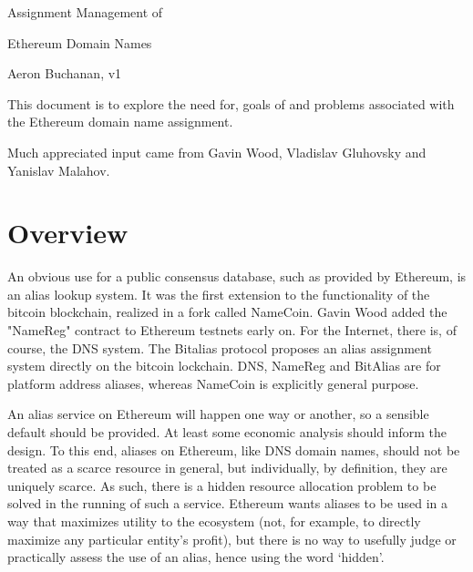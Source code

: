 \documentclass[10pt,a4paper]{article}
\begin{document}
\def\ether{Ether\xspace}
\def\ie{{i.e.}\xspace}
\def\eg{{e.g.}\xspace}
\def\tld{{\sc tld}}
\def\tlds{\tld{s}\xspace}
\def\sld{{\sc sld}}
\def\slds{\sld{s}\xspace}
\def\icann{{\sc icann}\xspace}
\def\qrcode{{\sc qr}-code\xspace}
\def\qrcodes{\qrcode{s}\xspace}
\def\nfc{{\sc nfc}\xspace}
\def\dapp{{\sc da}pp\xspace}
\def\dapps{\dapp{s}\xspace}
\def\dao{{\sc dao}\xspace}
\def\daos{\dao{s}\xspace}
\def\ambedon{{\sc ambedon}\xspace}

\begin{center}
{\huge Assignment Management of 

Ethereum Domain Names}

\vspace{0.6cm}
{\small Aeron Buchanan, v1}
\end{center}

This document is to explore the need for, goals of and problems associated with the Ethereum domain name assignment.

Much appreciated input came from Gavin Wood, Vladislav Gluhovsky and Yanislav Malahov.

\section*{Overview}

An obvious use for a public consensus database, such as provided by Ethereum, is an alias lookup system. It was the first extension to the functionality of the bitcoin blockchain, realized in a fork called NameCoin. Gavin Wood added the "NameReg" contract to Ethereum testnets early on. For the Internet, there is, of course, the DNS system. The Bitalias protocol proposes an alias assignment system directly on the bitcoin lockchain. DNS, NameReg and BitAlias are for platform address aliases, whereas NameCoin is explicitly general purpose. 

An alias service on Ethereum will happen one way or another, so a sensible default should be provided. At least some economic analysis should inform the design. To this end, aliases on Ethereum, like DNS domain names, should not be treated as a scarce resource in general, but individually, by definition, they are uniquely scarce. As such, there is a hidden resource allocation problem to be solved in the running of such a service. Ethereum wants aliases to be used in a way that maximizes utility to the ecosystem (not, for example, to directly maximize any particular entity's profit), but there is no way to usefully judge or practically assess the use of an alias, hence using the word `hidden'. 
\end{document}
